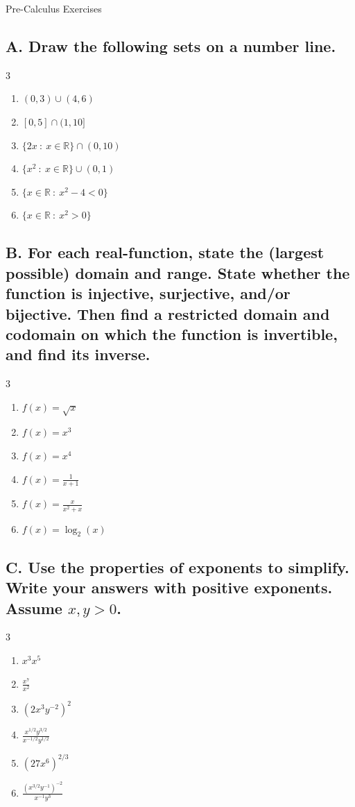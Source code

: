 \documentclass{article}
\newcommand{\R}{\mathbb{R}}
\begin{document}
\begin{center}
\begin{Huge}Pre-Calculus Exercises\end{Huge}
\end{center}


\subsection*{A. Draw the following sets on a number line.}
\begin{multicols}{3}
\begin{enumerate}
    \item $(0,3)\cup (4,6)$
    \item $[0,5]\cap (1, 10]$
    \item $\{2x\ :\ x\in \R\}\cap(0,10)$
    \item $\{x^2\ :\ x\in\R\}\cup(0,1)$
    \item $\{x\in\R\ :\ x^2-4<0\}$
    \item $\{x\in\R\ :\ x^2 > 0\}$
\end{enumerate}

\end{multicols}

\subsection*{B. For each real-function, state the (largest possible) domain and range. State whether the function is injective, surjective, and/or bijective. Then find a restricted domain and codomain on which the function is invertible, and find its inverse.}
\begin{multicols}{3}
\begin{enumerate}
    \item $f(x)=\sqrt{x}$
    \item $f(x)=x^3$
    \item $f(x)=x^4$
    \item $f(x)=\frac{1}{x+1}$
    \item $f(x)=\frac{x}{x^2+x}$
    \item $f(x)=\log_2(x)$
\end{enumerate}
\end{multicols}

\subsection*{C. Use the properties of exponents to simplify. Write your answers with positive exponents. Assume $x,y>0$.}
\begin{multicols}{3}
\begin{enumerate}
    \item $x^3x^5$
    \item $\frac{x^7}{x^2}$
    \item $(2x^3y^{-2})^2$
    \item $\frac{x^{1/2}y^{3/2}}{x^{-1/2}y^{1/2}}$
    \item $(27x^6)^{2/3}$
    \item $\frac{(x^{3/2}y^{-1})^{-2}}{x^{-1}y^3}$
\end{enumerate}
\end{multicols}
\end{document}
